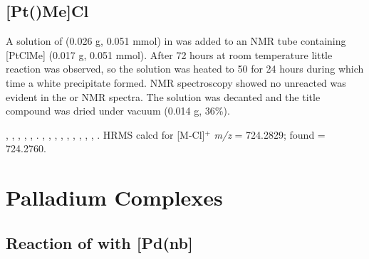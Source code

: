 
\subsection*{[Pt(\tBusixantphos)Me]Cl}


A solution of \tBusixantphos{} (0.026 g, 0.051 mmol) in  was added to an NMR tube containing [PtClMe] (0.017 g, 0.051 mmol).  After 72 hours at room temperature little reaction was observed, so the solution was heated to 50\degC{} for 24 hours during which time a white precipitate formed.  NMR spectroscopy showed no unreacted \tBusixantphos{} was evident in the \proton{} or \phosphorus{} NMR spectra.  The solution was decanted and the title compound was dried under vacuum (0.014 g, 36\%).  

,
,
,
,
,
.
,
,
,
,
,
,
,
,
,
.
HRMS calcd for  [M-Cl]$^+$ \emph{m/z} = 724.2829; found = 724.2760.

\section{Palladium Complexes}
\label{section:experimental:palladium}

\subsection*{Reaction of \tButhixantphos{} with [Pd(nb]}

